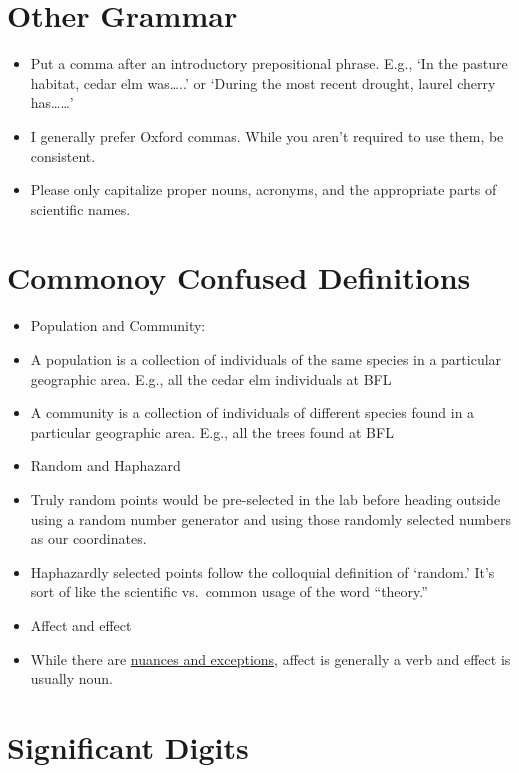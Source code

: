 \documentclass[]{book}
\providecommand{\tightlist}{%
  \setlength{\itemsep}{0pt}\setlength{\parskip}{0pt}}
\begin{document}
\section{Other Grammar}\label{other-grammar}

\begin{itemize}
\tightlist
\item
  Put a comma after an introductory prepositional phrase. E.g., `In the
  pasture habitat, cedar elm was\ldots{}..' or `During the most recent
  drought, laurel cherry has\ldots{}\ldots{}'
\item
  I generally prefer Oxford commas. While you aren't required to use
  them, be consistent.
\item
  Please only capitalize proper nouns, acronyms, and the appropriate
  parts of scientific names.
\end{itemize}

\section{Commonoy Confused
Definitions}\label{commonoy-confused-definitions}

\begin{itemize}
\tightlist
\item
  Population and Community:
\item
  A population is a collection of individuals of the same species in a
  particular geographic area. E.g., all the cedar elm individuals at BFL
\item
  A community is a collection of individuals of different species found
  in a particular geographic area. E.g., all the trees found at BFL
\item
  Random and Haphazard
\item
  Truly random points would be pre-selected in the lab before heading
  outside using a random number generator and using those randomly
  selected numbers as our coordinates.
\item
  Haphazardly selected points follow the colloquial definition of
  `random.' It's sort of like the scientific vs.~common usage of the
  word ``theory.''
\item
  Affect and effect
\item
  While there are
  \href{https://www.grammarly.com/blog/affect-vs-effect/}{nuances and
  exceptions}, affect is generally a verb and effect is usually noun.
\end{itemize}

\section{Significant Digits}\label{significant-digits}
\end{document}
